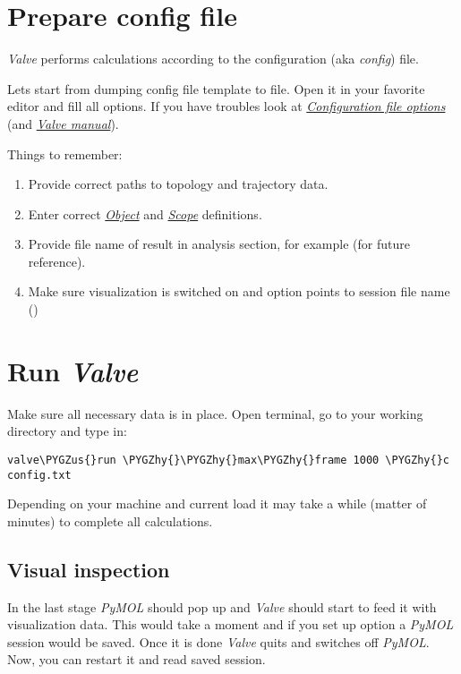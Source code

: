\documentclass[a4paper,10pt,english]{sphinxmanual}
\def\PYGZus{\char`\_}
\def\PYGZhy{\char`\-}
\begin{document}
\section{Prepare config file}
\label{valve/valve_tutorial:prepare-config-file}
\emph{Valve} performs calculations according to the configuration (aka \emph{config}) file.

Lets start from dumping config file template to  file. Open it in your favorite editor and fill all options.
If you have troubles look at {\hyperref[valve/valve_config::doc]{\emph{Configuration file options}}} (and {\hyperref[valve/valve_manual::doc]{\emph{Valve manual}}}).

Things to remember:
\begin{enumerate}
\item {} 
Provide correct paths to topology and trajectory data.

\item {} 
Enter correct {\hyperref[valve/valve_manual:object-definition]{\emph{Object}}} and {\hyperref[valve/valve_manual:scope-definition]{\emph{Scope}}} definitions.

\item {} 
Provide file name of result in analysis section, for example  (for future reference).

\item {} 
Make sure visualization is switched on and  option points to session file name ()

\end{enumerate}


\section{Run \emph{Valve}}
\label{valve/valve_tutorial:run-valve}
Make sure all necessary data is in place. Open terminal, go to your working directory and type in:

\begin{Verbatim}[commandchars=\\\{\}]
valve\PYGZus{}run \PYGZhy{}\PYGZhy{}max\PYGZhy{}frame 1000 \PYGZhy{}c config.txt
\end{Verbatim}

Depending on your machine and current load it may take a while (matter of minutes) to complete all calculations.


\subsection{Visual inspection}
\label{valve/valve_tutorial:visual-inspection}
In the last stage \emph{PyMOL} should pop up and \emph{Valve} should start to feed it with visualization data. This would take a moment and if you set up  option a \emph{PyMOL} session would be saved. Once it is done \emph{Valve} quits and switches off \emph{PyMOL}. Now, you can restart it and read saved session.
\end{document}
